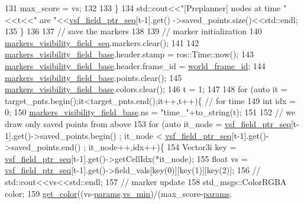 \begin{DoxyCode}
131                         max\_score = vs;
132 
133                 \}
134         std::cout<<\textcolor{stringliteral}{"[Preplanner] nodes at time "}<<t<<\textcolor{stringliteral}{" are "}<<\hyperlink{class_preplanner_aab0f91e34b86eaa581c7642ba5059308}{vsf\_field\_ptr\_seq}[t-1].get()
      ->saved\_points.size()<<std::endl;
135     \}
136 
137     \textcolor{comment}{// save the markers}
138 
139     \textcolor{comment}{// marker initialization     }
140     \hyperlink{class_preplanner_abcee90044b5d5935168ed132e3dfc8a6}{markers\_visibility\_field\_seq}.markers.clear();    
141 
142     \hyperlink{class_preplanner_a9c4d6a5e43241831b0ad11bdaf99ab16}{markers\_visibility\_field\_base}.header.stamp = ros::Time::now();
143     \hyperlink{class_preplanner_a9c4d6a5e43241831b0ad11bdaf99ab16}{markers\_visibility\_field\_base}.header.frame\_id = 
      \hyperlink{class_preplanner_a08cb79c25bd4ded139a572672e4492cd}{world\_frame\_id};
144     \hyperlink{class_preplanner_a9c4d6a5e43241831b0ad11bdaf99ab16}{markers\_visibility\_field\_base}.points.clear();
145     \hyperlink{class_preplanner_a9c4d6a5e43241831b0ad11bdaf99ab16}{markers\_visibility\_field\_base}.colors.clear();
146     t = 1;
147 
148     \textcolor{keywordflow}{for} (\textcolor{keyword}{auto} it = target\_pnts.begin();it<target\_pnts.end();it++,t++)\{ \textcolor{comment}{// for time}
149         \textcolor{keywordtype}{int} idx = 0;
150         \hyperlink{class_preplanner_a9c4d6a5e43241831b0ad11bdaf99ab16}{markers\_visibility\_field\_base}.ns = \textcolor{stringliteral}{"time\_"}+to\_string(t);
151 
152         \textcolor{comment}{// we draw only saved points from above }
153         \textcolor{keywordflow}{for} (\textcolor{keyword}{auto} it\_node = \hyperlink{class_preplanner_aab0f91e34b86eaa581c7642ba5059308}{vsf\_field\_ptr\_seq}[t-1].\textcolor{keyword}{get}()->saved\_points.begin() ; it\_node <
       \hyperlink{class_preplanner_aab0f91e34b86eaa581c7642ba5059308}{vsf\_field\_ptr\_seq}[t-1].get()->saved\_points.end() ; it\_node++,idx++)\{
154             Vector3i key = \hyperlink{class_preplanner_aab0f91e34b86eaa581c7642ba5059308}{vsf\_field\_ptr\_seq}[t-1].get()->getCellIdx(*it\_node);
155             \textcolor{keywordtype}{float} vs = \hyperlink{class_preplanner_aab0f91e34b86eaa581c7642ba5059308}{vsf\_field\_ptr\_seq}[t-1].get()->field\_vals[key(0)][key(1)][key(2)];
156             \textcolor{comment}{// std::cout<<vs<<std::endl;}
157             \textcolor{comment}{// marker update}
158             std\_msgs::ColorRGBA color;
159             \hyperlink{_common_8h_a75aaebf1a8b822524cc6af51a0cd83ef}{get\_color}((vs-\hyperlink{class_preplanner_a679cc4b70f041aff73769e7ec92dc5d0}{params}.\hyperlink{structchaser_1_1_preplanner_params_a2abe7915546a5d2ebde667a1d5ccfb44}{vs\_min})/(max\_score-\hyperlink{class_preplanner_a679cc4b70f041aff73769e7ec92dc5d0}{params}.

\end{DoxyCode}
